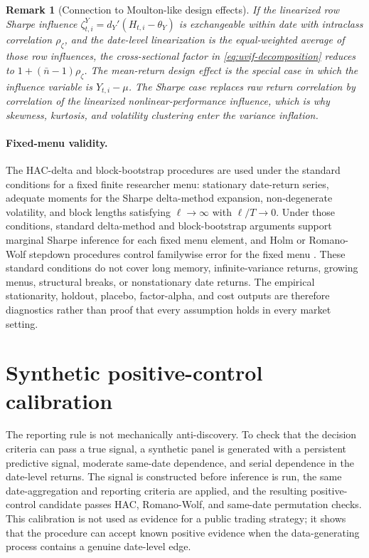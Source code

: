 \documentclass[12pt,a4paper]{article}
\newtheorem{remark}{Remark}
\begin{document}
\begin{remark}[Connection to Moulton-like design effects]
If the linearized row Sharpe influence
\(\zeta_{t,i}^Y=d_Y'(H_{t,i}-\theta_Y)\) is exchangeable within date
with intraclass correlation \(\rho_\zeta\), and the date-level
linearization is the equal-weighted average of those row influences, the
cross-sectional factor in \eqref{eq:uvif-decomposition} reduces to
\(1+(\bar n-1)\rho_\zeta\).  The mean-return design effect is the
special case in which the influence variable is \(Y_{t,i}-\mu\).  The
Sharpe case replaces raw return correlation by correlation of the
linearized nonlinear-performance influence, which is why skewness,
kurtosis, and volatility clustering enter the variance inflation.
\end{remark}

\paragraph{Fixed-menu validity.}
The HAC-delta and block-bootstrap procedures are used under the standard
conditions for a fixed finite researcher menu: stationary date-return
series, adequate moments for the Sharpe delta-method expansion,
non-degenerate volatility, and block lengths satisfying
\(\ell\to\infty\) with \(\ell/T\to0\).  Under those conditions, standard
delta-method and block-bootstrap arguments support marginal Sharpe
inference for each fixed menu element, and Holm or Romano-Wolf stepdown
procedures control familywise error for the fixed menu
\citep{holm1979simple,kunsch1989jackknife,romano2005stepwise,politis1994stationary,lahiri2003resampling}.
These standard conditions do not cover long memory, infinite-variance
returns, growing menus, structural breaks, or nonstationary date returns.
The empirical stationarity, holdout, placebo, factor-alpha, and cost
outputs are therefore diagnostics rather than proof that every
assumption holds in every market setting.

\section{Synthetic positive-control calibration}
\label{sec:positive-control}

The reporting rule is not mechanically anti-discovery.  To check that the
decision criteria can pass a true signal, a synthetic panel is generated
with a persistent predictive signal, moderate same-date dependence, and
serial dependence in the date-level returns.  The signal is constructed
before inference is run, the same date-aggregation and reporting criteria are
applied, and the resulting positive-control candidate passes HAC,
Romano-Wolf, and same-date permutation checks.  This calibration is not
used as evidence for a public trading strategy; it shows that the
procedure can accept known positive evidence when the data-generating
process contains a genuine date-level edge.
\end{document}
